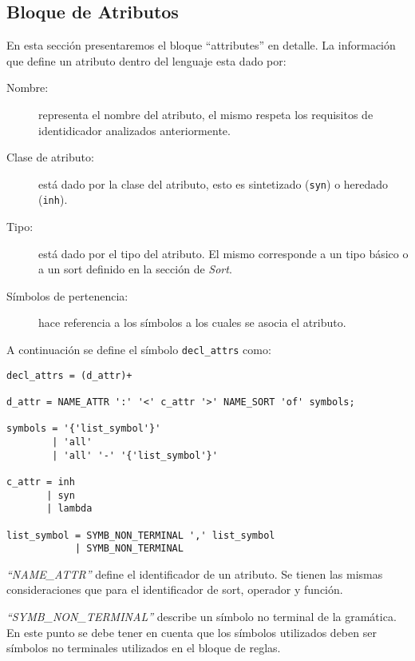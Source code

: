 \subsection{Bloque de Atributos}
En esta sección presentaremos el bloque ``attributes'' en detalle. La información que define un atributo dentro del lenguaje esta dado por: 

\begin{description}
\item [Nombre:] representa el nombre del atributo, el mismo respeta los requisitos de identidicador analizados anteriormente.

\item [Clase de atributo:] está dado por la clase del atributo, esto es sintetizado (\texttt{syn}) o heredado (\texttt{inh}).

\item [Tipo:] está dado por el tipo del atributo. El mismo corresponde a un tipo básico o a un sort definido en la sección de \textit{Sort}.

\item [Símbolos de pertenencia:] hace referencia a los símbolos a los cuales se asocia el atributo.
\end{description}

A continuación se define el símbolo \texttt{decl\_attrs} como:

\begin{center}
\lstset{language=inform}
\begin{lstlisting}
decl_attrs = (d_attr)+ 

d_attr = NAME_ATTR ':' '<' c_attr '>' NAME_SORT 'of' symbols;

symbols = '{'list_symbol'}' 
        | 'all'
        | 'all' '-' '{'list_symbol'}'

c_attr = inh
       | syn
       | lambda

list_symbol = SYMB_NON_TERMINAL ',' list_symbol
            | SYMB_NON_TERMINAL 
\end{lstlisting}
\end{center}

\textit{``NAME\_ATTR''} define el identificador de un atributo. Se tienen las mismas consideraciones que para el identificador de sort, operador y función.

\textit{``SYMB\_NON\_TERMINAL''} describe un símbolo no terminal de la gramática. En este punto se debe tener en cuenta que los símbolos utilizados deben ser símbolos no terminales utilizados en el bloque de reglas.

